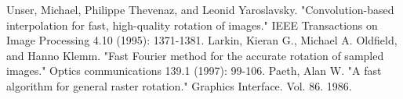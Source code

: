 \documentclass[12pt]{article}
\begin{document}
\begin{thebibliography}{2}

  Unser, Michael, Philippe Thevenaz, and Leonid Yaroslavsky. 
  "Convolution-based interpolation for fast, high-quality rotation of images." 
  IEEE Transactions on Image Processing 4.10 (1995): 1371-1381.
  Larkin, Kieran G., Michael A. Oldfield, and Hanno Klemm. 
  "Fast Fourier method for the accurate rotation of sampled images." 
  Optics communications 139.1 (1997): 99-106.
	Paeth, Alan W. 
	"A fast algorithm for general raster rotation." 
	Graphics Interface. Vol. 86. 1986.

\end{thebibliography}
\end{document}
